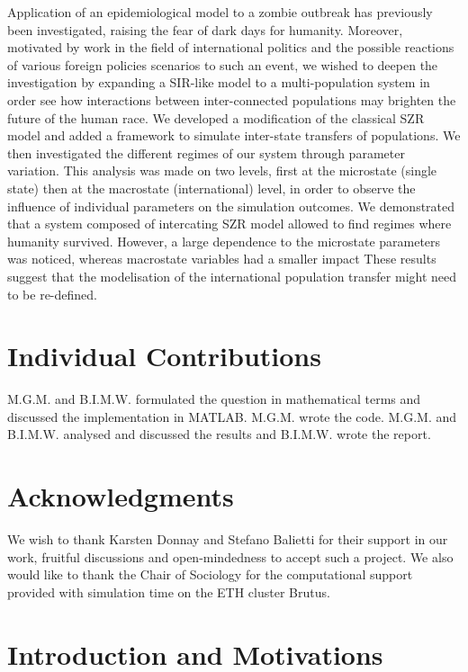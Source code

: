 \documentclass[11pt]{article} %
\begin{document}
Application of an epidemiological model to a zombie outbreak has previously been investigated, raising the fear of dark days for humanity. Moreover, motivated by work in the field of international politics and the possible reactions of various foreign policies scenarios to such an event, we wished to deepen the investigation by expanding a SIR-like model to a multi-population system in order see how interactions between inter-connected populations may brighten the future of the human race. We developed a modification of the classical SZR model and added a framework to simulate inter-state transfers of populations. We then investigated the different regimes of our system through parameter variation. This analysis was made on two levels, first at the microstate (single state) then at the macrostate (international) level, in order to observe the influence of individual parameters on the simulation outcomes. We demonstrated that a system composed of intercating SZR model allowed to find regimes where humanity survived. However, a large dependence to the microstate parameters was noticed, whereas macrostate variables had a smaller impact These results suggest that the modelisation of the international population transfer might need to be re-defined.  


\section{Individual Contributions}\indent

M.G.M. and B.I.M.W. formulated the question in mathematical terms and discussed the implementation in MATLAB. M.G.M. wrote the code. M.G.M. and B.I.M.W. analysed and discussed the results and B.I.M.W. wrote the report.

\section{Acknowledgments}\indent

We wish to thank Karsten Donnay and Stefano Balietti for their support in our work, fruitful discussions and open-mindedness to accept such a project. We also would like to thank the Chair of Sociology for the computational support provided with simulation time on the ETH cluster Brutus.







\newpage
\section{Introduction and Motivations}\indent
\end{document}
